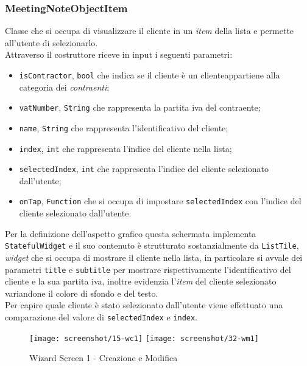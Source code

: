 \subsubsection*{MeetingNoteObjectItem}
\label{subsubsec:meeting-note-object-item}

Classe che si occupa di visualizzare il cliente in un \emph{item} della lista e permette all'utente di selezionarlo. \\
Attraverso il costruttore riceve in input i seguenti parametri:
\begin{itemize}
    \item \lstinline{isContractor}, \lstinline{bool} che indica se il cliente è un \gls{cliente}\glsoccur appartiene alla categoria dei \emph{contraenti};
    \item \lstinline{vatNumber}, \lstinline{String} che rappresenta la partita iva del contraente;
    \item \lstinline{name}, \lstinline{String} che rappresenta l'identificativo del cliente;
    \item \lstinline{index}, \lstinline{int} che rappresenta l'indice del cliente nella lista;
    \item \lstinline{selectedIndex}, \lstinline{int} che rappresenta l'indice del cliente selezionato dall'utente;
    \item \lstinline{onTap}, \lstinline{Function} che si occupa di impostare \lstinline{selectedIndex} con l'indice del cliente selezionato dall'utente.
\end{itemize}
Per la definizione dell'aspetto grafico questa schermata implementa \lstinline{StatefulWidget} e il suo contenuto è strutturato sostanzialmente da \lstinline{ListTile}\cite{site:list-tile}, \emph{widget} che si occupa di mostrare il cliente nella lista, in particolare si avvale dei parametri \lstinline{title} e \lstinline{subtitle} per mostrare rispettivamente l'identificativo del cliente e la sua partita iva, inoltre evidenzia l'\emph{item} del cliente selezionato variandone il colore di sfondo e del testo.\\
Per capire quale cliente è stato selezionato dall'utente viene effettuato una comparazione del valore di \lstinline{selectedIndex} e \lstinline{index}.

\begin{figure}[!h] 
    \centering 
    \texttt{[image: screenshot/15-wc1]}
    \hfill
    \texttt{[image: screenshot/32-wm1]} 
    \caption{Wizard Screen 1 - Creazione e Modifica}
    \label{fig:w1}
\end{figure}

